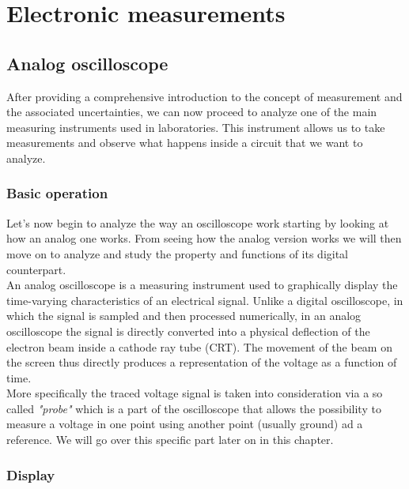 \documentclass[../main.tex]{subfiles}
\begin{document}
\clearpage
\thispagestyle{empty}
\vspace*{7cm}
\section{Electronic measurements}
\vspace*{1.5cm}


\subsection{Analog oscilloscope}

After providing a comprehensive introduction to the concept of measurement and the associated uncertainties, we can now proceed to analyze one of the main measuring instruments used in laboratories. This instrument allows us to take measurements and observe what happens inside a circuit that we want to analyze.

\subsubsection{Basic operation}

Let's now begin to analyze the way an oscilloscope work starting by looking at how an analog one works. From seeing how the analog version works we will then move on to analyze and study the property and functions of its digital counterpart.\\

An analog oscilloscope is a measuring instrument used to graphically display the time-varying characteristics of an electrical signal. Unlike a digital oscilloscope, in which the signal is sampled and then processed numerically, in an analog oscilloscope the signal is directly converted into a physical deflection of the electron beam inside a cathode ray tube (CRT). The movement of the beam on the screen thus directly produces a representation of the voltage as a function of time.\\

More specifically the traced voltage signal is taken into consideration via a so called \textit{"probe"} which is a part of the oscilloscope that allows the possibility to measure a voltage in one point using another point (usually ground) ad a reference. We will go over this specific part later on in this chapter.


\subsubsection{Display}
\end{document}
